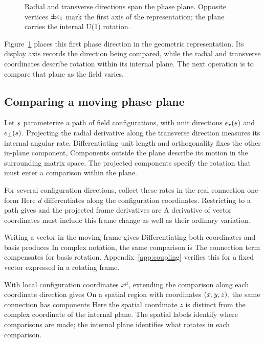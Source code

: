 \begin{figure}[!htbp]
\centering
{}
\caption{Radial and transverse directions span the phase plane. Opposite vertices $\pm e_1$ mark the first axis of the representation; the plane carries the internal U(1) rotation.}
\label{fig:phase}
\end{figure}

Figure~\ref{fig:phase} places this first phase direction in the geometric representation. Its display axis records the direction being compared, while the radial and transverse coordinates describe rotation within its internal plane. The next operation is to compare that plane as the field varies.
\FloatBarrier

\subsection{Comparing a moving phase plane}
Let $s$ parameterize a path of field configurations, with unit directions ${e_r}(s)$ and ${e_\perp}(s)$. Projecting the radial derivative along the transverse direction measures its internal angular rate,
\FieldConnectionRateDisplay
Differentiating unit length and orthogonality fixes the other in-plane component,
\FieldConnectionProjectedDisplay
Components outside the plane describe its motion in the surrounding matrix space. The projected components specify the rotation that must enter a comparison within the plane.

For several configuration directions, collect these rates in the real connection one-form
\PhasePhaseConnectionDisplay
Here $d$ differentiates along the configuration coordinates. Restricting to a path gives
\PhaseConnectionPathDisplay
and the projected frame derivatives are
\PhaseProjectedDerivativesDisplay
A derivative of vector coordinates must include this frame change as well as their ordinary variation.

Writing a vector in the moving frame gives
\FieldConnectionVectorDisplay
Differentiating both coordinates and basis produces
\FieldConnectionVectorDerivativeDisplay
In complex notation, the same comparison is
\FieldConnectionCovariantDerivativeDisplay
The connection term compensates for basis rotation. Appendix~\ref{app:coupling} verifies this for a fixed vector expressed in a rotating frame.

With local configuration coordinates $x^\mu$, extending the comparison along each coordinate direction gives
\FieldConnectionCoordinateDirectionsDisplay
On a spatial region with coordinates $(x,y,z)$, the same connection has components
\FieldSpatialConnectionDisplay
Here the spatial coordinate $z$ is distinct from the complex coordinate of the internal plane. The spatial labels identify where comparisons are made; the internal plane identifies what rotates in each comparison.

